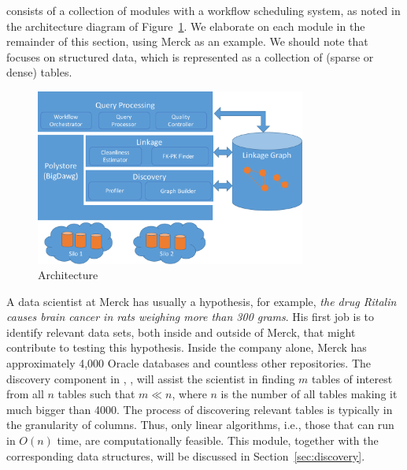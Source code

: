 \dcv consists of a collection of modules with a workflow scheduling system, as noted in the architecture diagram of 
Figure~\ref{fig:arch}. We elaborate on each module in the remainder of this section, using Merck as an example.
We should note that \dcv focuses on structured data, which is represented as a collection of (sparse or dense) tables.


\begin{figure}[!t]
\includegraphics[width=3.5in]{arch3.pdf}
\caption{\dcv Architecture}
\label{fig:arch}
\end{figure}


\stitle{[Discovery.]} 
A data scientist at Merck has usually a hypothesis, for example, {\it the drug Ritalin causes brain cancer in rats weighing more than 300 grams}.
His first job is to identify relevant data sets, both inside and outside of Merck, that might contribute to testing this hypothesis. Inside the company alone, Merck has approximately 4,000 Oracle databases and countless other repositories. The discovery component in \dcv, , will assist the scientist in finding $m$ tables of interest from all $n$ tables such that $m \ll n$, where $n$ is the number of all tables making it much bigger than 4000.  
%
The process of discovering relevant tables is typically in the granularity of columns. 
Thus, only linear algorithms, i.e., those that can run in $O(n)$ time, are computationally feasible.
%
This module, together with the corresponding data structures, will be discussed in Section~\ref{sec:discovery}.



